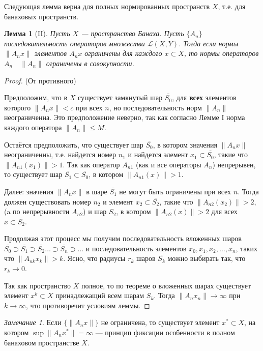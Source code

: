 \documentclass[12pt,a4paper,titlepage,oneside]{book}
\theoremstyle{definition}
\theoremstyle{plain}
\theoremstyle{break}
\theoremstyle{remark}
\newtheorem*{remark}{Замечание}
\theoremstyle{remark}
\theoremstyle{remark}
\theoremstyle{remark}
\theoremstyle{plain}
\newtheorem*{lemma}{Лемма}
\theoremstyle{plain}
\begin{document}
Следующая лемма верна для полных нормированных пространств $X$, т.е. для банаховых пространств.

\begin{lemma}[II]
Пусть $X$ --- пространство Банаха. Пусть $\lbrace A_n\rbrace$ последовательность операторов множества $\mathcal{L}(X,Y)$. Тогда если нормы $\lVert A_n x\rVert$ элементов $A_n x$ ограничены для каждого $x \subset X$, то нормы операторов $A_n \quad \lVert A_n\rVert$ ограничены в совокупности.
\end{lemma}

\begin{proof}
(От противного)

Предположим, что в $X$ существует замкнутый шар $\bar{S_0}$, для \textbf{всех} элементов которого $\lVert A_n x\rVert < c$ при всех $n$, но последовательность норм $\lVert A_n\rVert$ неограниченна. Это предположение неверно, так как согласно Лемме I норма каждого оператора $\lVert A_n\rVert \leqslant M$.

Остаётся предположить, что существует шар $\bar{S_0}$, в котором значения $\lVert A_n x\rVert$ неограниченны, т.е. найдется номер $n_1$ и найдется элемент $x_1 \subset \bar{S_0}$, такие что $\lVert A_{n1} (x_1)\rVert > 1$. Так как оператор $A_{n1}$ (как и все операторы $A_n$) непрерывен, то существует шар $\bar{S_1} \subset \bar{S_0}$, в котором $\lVert A_{n1} (x)\rVert > 1$.

Далее: значения $\lVert A_n x\rVert$ в шаре $\bar{S_1}$ не могут быть ограничены при всех $n$. Тогда должен существовать номер $n_2$ и элемент $x_2 \subset \bar{S_2}$, такие что $\lVert A_{n2} (x_2)\rVert > 2$, (a по непрерывности $A_{n2}$) и шар $S_2$, в котором $\lVert A_{n2} (x)\rVert > 2$ для всех $x \subset \bar{S_2}$.

Продолжая этот процесс мы получим последовательность вложенных шаров $\bar{S_0} \supset \bar{S_1} \supset \bar{S_2} \ldots \supset \bar{S_n} \supset \ldots$ и последовательность элементов $x_0, x_1, x_2, \ldots, x_n$, таких что $\lVert A_{nk} x_k\rVert > k$. Ясно, что радиусы $r_k$ шаров $\bar{S_k}$ можно выбирать так, что $r_k \to 0$.

Так как пространство $X$ полное, то по теореме о вложенных шарах существует элемент $x^k \subset X$ принадлежащий всем шарам $S_k$. Тогда $\lVert A_n x_n\rVert \to \infty$ при $k \to \infty$, что противоречит условиям леммы.
\end{proof}

\begin{remark}
Если $\lbrace \lVert A_n x\rVert \rbrace$ не ограничена, то существует элемент $x^* \subset X$, на котором $\sup\limits\lVert A_n x^*\rVert = \infty$ --- принцип фиксации особенности в полном банаховом пространстве $X$.
\end{remark}
\end{document}
